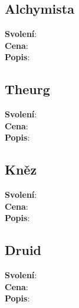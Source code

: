 \begin{tcolorbox}
\subsection{Alchymista}
\label{sec:pov-alchymista}
\textbf{Svolení}:\\
\textbf{Cena}:\\
\textbf{Popis}:\\

\end{tcolorbox}

\begin{tcolorbox}
\subsection{Theurg}
\label{sec:pov-theurg}
\textbf{Svolení}:\\
\textbf{Cena}:\\
\textbf{Popis}:\\

\end{tcolorbox}

\begin{tcolorbox}  
\subsection{Kněz}
\label{sec:pov-knez}
\textbf{Svolení}:\\
\textbf{Cena}:\\
\textbf{Popis}:\\

\end{tcolorbox}
\begin{tcolorbox}
  
\subsection{Druid}
\label{sec:pov-druid}
\textbf{Svolení}:\\
\textbf{Cena}:\\
\textbf{Popis}:\\

\end{tcolorbox}

